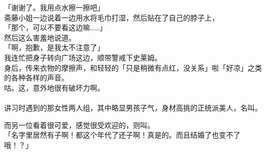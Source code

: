 「谢谢了。我用点水擦一擦吧」\\

斋藤小姐一边说着一边用水将毛巾打湿，然后贴在了自己的脖子上，\\

「那个，可以不要看这边嘛……」\\

然后这么害羞地说道。\\

「啊，抱歉，是我太不注意了」\\

我连忙把身子转向广场这边，顺带警戒下史莱姆。\\

身后，传来衣物的摩擦声，和轻轻的「只是稍微有点红，没关系」啦「好凉」之类的各种各样的声音。\\

咕。这，意外地很有破坏力啊。\\

\sqsplit\\

讲习时遇到的那女性两人组，其中略显男孩子气，身材高挑的正统派美人，名叫。

而另一位看着很可爱，感觉很受欢迎的，则叫。\\

「名字里居然有子啊！都这个年代了还子啊！真是的。而且结婚了也变不了哦！？」\\

